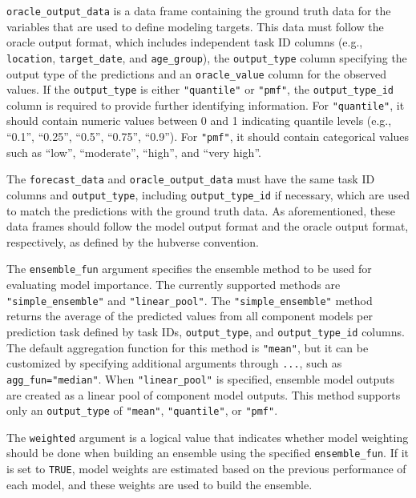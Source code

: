 \documentclass[
  article,
  shortnames,
  notitle]{jss}
\begin{document}
\texttt{oracle\_output\_data} is a data frame containing the ground
truth data for the variables that are used to define modeling targets.
This data must follow the oracle output format, which includes
independent task ID columns (e.g., \texttt{location},
\texttt{target\_date}, and \texttt{age\_group}), the
\texttt{output\_type} column specifying the output type of the
predictions and an \texttt{oracle\_value} column for the observed
values. If the \texttt{output\_type} is either \texttt{"quantile"} or
\texttt{"pmf"}, the \texttt{output\_type\_id} column is required to
provide further identifying information. For \texttt{"quantile"}, it
should contain numeric values between 0 and 1 indicating quantile levels
(e.g., ``0.1'', ``0.25'', ``0.5'', ``0.75'', ``0.9''). For
\texttt{"pmf"}, it should contain categorical values such as ``low'',
``moderate'', ``high'', and ``very high''.

The \texttt{forecast\_data} and \texttt{oracle\_output\_data} must have
the same task ID columns and \texttt{output\_type}, including
\texttt{output\_type\_id} if necessary, which are used to match the
predictions with the ground truth data. As aforementioned, these data
frames should follow the model output format and the oracle output
format, respectively, as defined by the hubverse convention.

The \texttt{ensemble\_fun} argument specifies the ensemble method to be
used for evaluating model importance. The currently supported methods
are \texttt{"simple\_ensemble"} and \texttt{"linear\_pool"}. The
\texttt{"simple\_ensemble"} method returns the average of the predicted
values from all component models per prediction task defined by task
IDs, \texttt{output\_type}, and \texttt{output\_type\_id} columns. The
default aggregation function for this method is \texttt{"mean"}, but it
can be customized by specifying additional arguments through
\texttt{...}, such as \texttt{agg\_fun="median"}. When
\texttt{"linear\_pool"} is specified, ensemble model outputs are created
as a linear pool of component model outputs. This method supports only
an \texttt{output\_type} of \texttt{"mean"}, \texttt{"quantile"}, or
\texttt{"pmf"}.

The \texttt{weighted} argument is a logical value that indicates whether
model weighting should be done when building an ensemble using the
specified \texttt{ensemble\_fun}. If it is set to \texttt{TRUE}, model
weights are estimated based on the previous performance of each model,
and these weights are used to build the ensemble.
\end{document}
